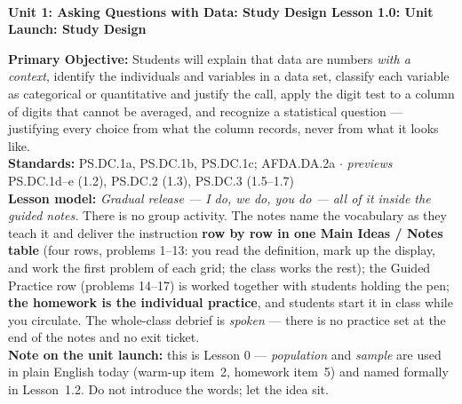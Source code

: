 \documentclass[10pt]{article}
\newcommand{\UnitNumberName}{Unit 1: Asking Questions with Data: Study Design \quad}
\newcommand{\LessonNumberName}{Lesson 1.0: Unit Launch: Study Design}
\begin{document}
\begin{center}
    {\Large\bfseries \CourseName \\
    {\small\bfseries \UnitNumberName \LessonNumberName}}
\end{center}

\begin{tcolorbox}[colback=frost, colframe=cerulean, boxrule=0.9pt, arc=2mm,
    left=2mm, right=2mm, top=1.5mm, bottom=1.5mm]
    \textbf{Primary Objective:} Students will explain that data are numbers \emph{with a
    context}, identify the individuals and variables in a data set, classify each variable
    as categorical or quantitative and justify the call, apply the digit test to a column of
    digits that cannot be averaged, and recognize a statistical question --- justifying every
    choice from what the column records, never from what it looks like.
    \\[2pt]
    \textbf{Standards:} PS.DC.1a, PS.DC.1b, PS.DC.1c; AFDA.DA.2a \quad$\cdot$\quad
    \emph{previews} PS.DC.1d--e (1.2), PS.DC.2 (1.3), PS.DC.3 (1.5--1.7)
    \\[2pt]
    \textbf{Lesson model:} \emph{Gradual release --- I do, we do, you do --- all of it inside
    the guided notes.} There is no group activity. The notes name the vocabulary as they teach
    it and deliver the instruction \textbf{row by row in one Main Ideas / Notes table} (four
    rows, problems 1--13: you read the definition, mark up the display, and work the first
    problem of each grid; the class works the rest); the Guided Practice row (problems 14--17)
    is worked together with students holding the pen; \textbf{the homework is the individual
    practice}, and students start it in class while you circulate. The whole-class debrief is
    \emph{spoken} --- there is no practice set at the end of the notes and no exit ticket.
    \\[2pt]
    \textbf{Note on the unit launch:} this is Lesson 0 --- \emph{population} and \emph{sample}
    are used in plain English today (warm-up item~2, homework item~5) and named formally in
    Lesson~1.2. Do not introduce the words; let the idea sit.
\end{tcolorbox}
\end{document}
